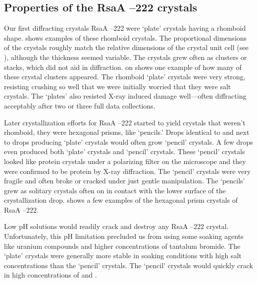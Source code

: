 \subsection{Properties of the RsaA --222 crystals}\label{sec:properties-crystals}
Our first diffracting crystals RsaA --222 were `plate' crystals having a rhomboid shape.   shows examples of these rhomboid crystals. The proportional dimensions of the crystals roughly match the relative dimensions of the crystal unit cell (see ), although the thickness seemed variable. The crystals grew often as clusters or stacks, which did not aid in diffraction.  on  shows one example of how many of these crystal clusters appeared. The rhomboid `plate' crystals were very strong, resisting crushing so well that we were initially worried that they were salt crystals. The `plates' also resisted X-ray induced damage well---often diffracting acceptably after two or three full data collections. 

Later crystallization efforts for RsaA --222 started to yield crystals that weren't rhomboid, they were hexagonal prisms, like `pencils.' Drops identical to and next to drops producing `plate' crystals would often grow `pencil' crystals. A few drops even produced both `plate' crystals and `pencil' crystals. These `pencil' crystals looked like protein crystals under a polarizing filter on the microscope and they were confirmed to be protein by X-ray diffraction. The `pencil' crystals were very fragile and often broke or cracked under just gentle manipulation. The `pencils' grew as solitary crystals often on in contact with the lower surface of the crystallization drop.  shows a few examples of the hexagonal prism crystals of RsaA --222.

Low pH solutions would readily crack and destroy any RsaA --222 crystal. Unfortunately, this pH limitation precluded us from using some soaking agents like uranium compounds and higher concentrations of tantalum bromide. The `plate' crystals were generally more stable in soaking conditions with high salt concentrations than the `pencil' crystals. The `pencil' crystals would quickly crack in high concentrations of  and .

